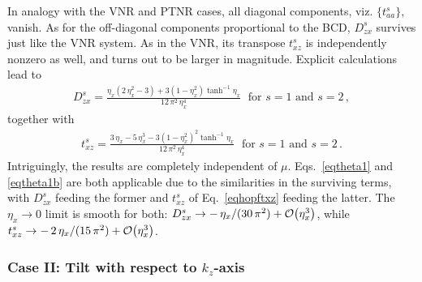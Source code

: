 \documentclass[aps,prb,onecolumn,nofootinbib,citeautoscript,10pt]{revtex4-2}
\begin{document}
In analogy with the VNR and PTNR cases, all diagonal components, viz. $\lbrace t^s_{aa} \rbrace $, vanish.
As for the off-diagonal components proportional to the BCD, $D^s_{zx}$ survives just like the VNR system. As in the VNR, its transpose $t^s_{xz}$ is independently nonzero as well, and turns out to be larger in magnitude. Explicit calculations lead to
\begin{align}
D^s_{zx} = \frac{\eta _x \left(2 \,\eta _x^2-3\right)
+ 3 \left( 1- \eta _x^2 \right) \tanh ^{-1} \eta _x}   {12 \,\pi ^2\, \eta _x^4}\;
\text{ for } s=1 \text{ and } s=2\,,
\end{align}
together with
\begin{align}
\label{eqhopftxz}
t^s_{xz} = \frac{3\,\eta_x - 5\,\eta_x^3 - 3\left(1-\eta_x^2\right)^2 \tanh^{-1} \eta_x}{12\, \pi^2\, \eta_x^4}\;
\text{ for } s=1 \text{ and } s=2\,.
\end{align}
Intriguingly, the results are completely independent of $\mu$. Eqs.~\eqref{eqtheta1} and \eqref{eqtheta1b} are both applicable due to the similarities in the surviving terms, with $D^s_{zx}$ feeding the former and $t^s_{xz}$ of Eq.~\eqref{eqhopftxz} feeding the latter. The $\eta_x \rightarrow 0$ limit is smooth for both: $D^s_{zx} \rightarrow -\,\eta _x
/ (30 \,\pi ^2 ) + \order{\eta_x^3}$, while $t^s_{xz} \rightarrow -\,2\,\eta_x/(15\,\pi^2) + \order{\eta_x^3}$.


\subsubsection{Case II: Tilt with respect to $ k_z $-axis}
\end{document}
